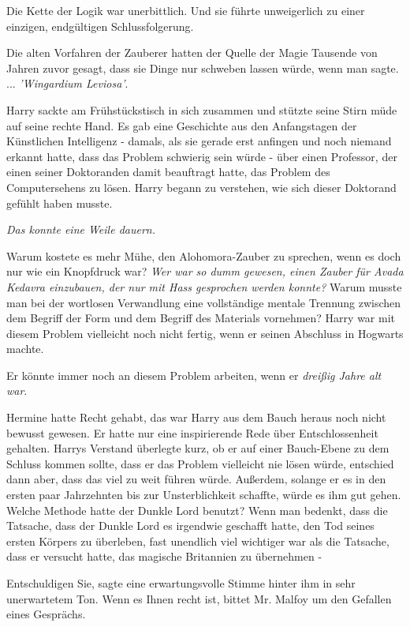Die Kette der Logik war unerbittlich. Und sie führte unweigerlich zu einer
einzigen, endgültigen Schlussfolgerung.

Die alten Vorfahren der Zauberer hatten der Quelle der Magie Tausende von Jahren
zuvor gesagt, dass sie Dinge nur schweben lassen würde, wenn man sagte.
...\emph{ 'Wingardium Leviosa'}.

Harry sackte am Frühstückstisch in sich zusammen und stützte seine Stirn müde
auf seine rechte Hand. Es gab eine Geschichte aus den Anfangstagen der
Künstlichen Intelligenz - damals, als sie gerade erst anfingen und noch niemand
erkannt hatte, dass das Problem schwierig sein würde - über einen Professor, der
einen seiner Doktoranden damit beauftragt hatte, das Problem des Computersehens
zu lösen. Harry begann zu verstehen, wie sich dieser Doktorand gefühlt haben
musste.

\emph{Das konnte eine Weile dauern.}

Warum kostete es mehr Mühe, den Alohomora-Zauber zu sprechen, wenn es doch nur
wie ein Knopfdruck war? \emph{Wer war so dumm gewesen, einen Zauber für Avada
Kedavra einzubauen, der nur mit Hass gesprochen werden konnte? }Warum musste man
bei der wortlosen Verwandlung eine vollständige mentale Trennung zwischen dem
Begriff der Form und dem Begriff des Materials vornehmen? Harry war mit diesem
Problem vielleicht noch nicht fertig, wenn er seinen Abschluss in Hogwarts
machte.

Er könnte immer noch an diesem Problem arbeiten, wenn er \emph{dreißig Jahre alt
war}.

Hermine hatte Recht gehabt, das war Harry aus dem Bauch heraus noch nicht
bewusst gewesen. Er hatte nur eine inspirierende Rede über Entschlossenheit
gehalten. Harrys Verstand überlegte kurz, ob er auf einer Bauch-Ebene zu dem
Schluss kommen sollte, dass er das Problem vielleicht nie lösen würde, entschied
dann aber, dass das viel zu weit führen würde. Außerdem, solange er es in den
ersten paar Jahrzehnten bis zur Unsterblichkeit schaffte, würde es ihm gut
gehen. Welche Methode hatte der Dunkle Lord benutzt? Wenn man bedenkt, dass die
Tatsache, dass der Dunkle Lord es irgendwie geschafft hatte, den Tod seines
ersten Körpers zu überleben, fast unendlich viel wichtiger war als die Tatsache,
dass er versucht hatte, das magische Britannien zu übernehmen -

\glqq Entschuldigen Sie\grqq{}, sagte eine erwartungsvolle Stimme hinter ihm in
sehr unerwartetem Ton. \glqq Wenn es Ihnen recht ist, bittet Mr. Malfoy um den
Gefallen eines Gesprächs.\grqq{}

